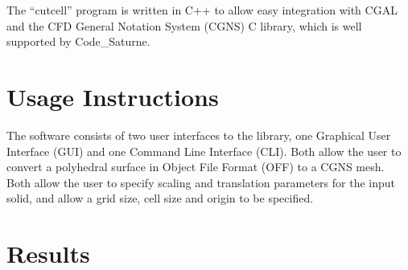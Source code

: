 \documentclass[a4paper,10pt]{article}
\begin{document}
The ``cutcell'' program is written in C++ to allow easy integration with CGAL
and the CFD General Notation System (CGNS) \cite{cgns} C library, which is well
supported by Code\_Saturne.

\section{Usage Instructions}

The software consists of two user interfaces to the library, one Graphical User
Interface (GUI) and one Command Line Interface (CLI). Both allow the user to
convert a polyhedral surface in Object File Format (OFF) to a CGNS mesh. Both
allow the user to specify scaling and translation parameters for the input
solid, and allow a grid size, cell size and origin to be specified.

\section{Results}
\end{document}
